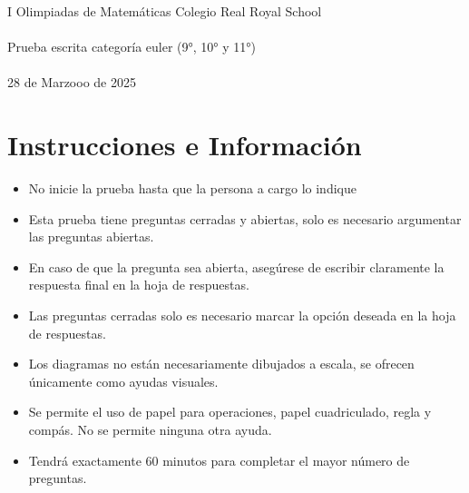 \documentclass{article}
\begin{document}
\begin{center}
    \LARGE{I Olimpiadas de Matemáticas Colegio Real Royal School}
    \\~\\
    \large{Prueba escrita categoría euler (9°, 10° y 11°)}
    \\~\\
    \large{28 de Marzooo de 2025}
\end{center}
\section{Instrucciones e Información}
\begin{itemize}
    \item No inicie la prueba hasta que la persona a cargo lo indique
    \item Esta prueba tiene preguntas cerradas y abiertas, solo es necesario argumentar las preguntas
          abiertas.
    \item En caso de que la pregunta sea abierta, asegúrese de escribir claramente la respuesta final en la hoja de respuestas.
    \item Las preguntas cerradas solo es necesario marcar la opción deseada en la hoja de respuestas.
    \item Los diagramas no están necesariamente dibujados a escala, se ofrecen únicamente como ayudas visuales.
    \item Se permite el uso de papel para operaciones, papel cuadriculado, regla y compás. No se
          permite ninguna otra ayuda.
    \item Tendrá exactamente 60 minutos para completar el mayor número de preguntas.
\end{itemize}
\end{document}

